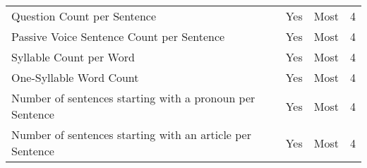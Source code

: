 \begin{table}[htbp]
\begin{tabular}{m{} c c c}
        Question Count per Sentence & Yes & Most & 4 \\
        Passive Voice Sentence Count per Sentence & Yes & Most & 4 \\
        Syllable Count per Word & Yes & Most & 4 \\
        One-Syllable Word Count & Yes & Most & 4 \\
        Number of sentences starting with a pronoun per Sentence & Yes & Most & 4 \\
        Number of sentences starting with an article per Sentence & Yes & Most & 4 \\
        \bottomrule
    \end{tabular}
\end{table}